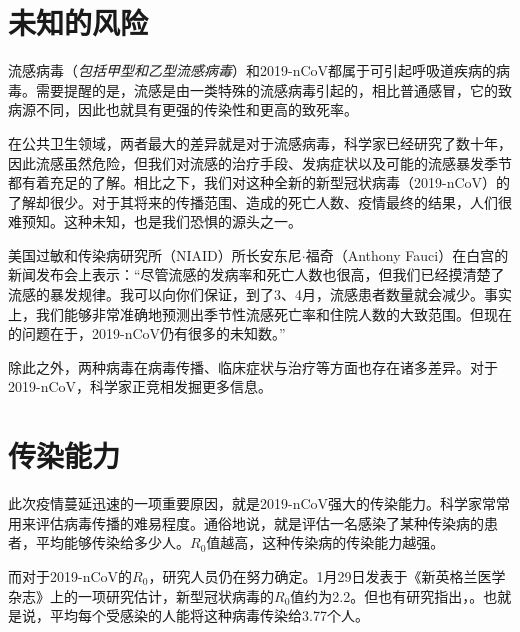 \begin{multicols}{3}

\section*{未知的风险}
流感病毒（\textit{包括甲型和乙型流感病毒}）和2019-nCoV都属于可引起呼吸道疾病的病毒。需要提醒的是，流感是由一类特殊的流感病毒引起的，相比普通感冒，它的致病源不同，因此也就具有更强的传染性和更高的致死率。

在公共卫生领域，两者最大的差异就是对于流感病毒，科学家已经研究了数十年，因此流感虽然危险，但我们对流感的治疗手段、发病症状以及可能的流感暴发季节都有着充足的了解。相比之下，我们对这种全新的新型冠状病毒（2019-nCoV）的了解却很少。对于其将来的传播范围、造成的死亡人数、疫情最终的结果，人们很难预知。这种未知，也是我们恐惧的源头之一。

美国过敏和传染病研究所（NIAID）所长安东尼$\cdot $福奇（Anthony 
Fauci）在白宫的新闻发布会上表示：``尽管流感的发病率和死亡人数也很高，但我们已经摸清楚了流感的暴发规律。我可以向你们保证，到了3、4月，流感患者数量就会减少。事实上，我们能够非常准确地预测出季节性流感死亡率和住院人数的大致范围。但现在的问题在于，2019-nCoV仍有很多的未知数。''

除此之外，两种病毒在病毒传播、临床症状与治疗等方面也存在诸多差异。对于2019-nCoV，科学家正竞相发掘更多信息。

\section*{传染能力}
此次疫情蔓延迅速的一项重要原因，就是2019-nCoV强大的传染能力。科学家常常用来评估病毒传播的难易程度。通俗地说，就是评估一名感染了某种传染病的患者，平均能够传染给多少人。$R_0$值越高，这种传染病的传染能力越强。

而对于2019-nCoV的$R_0$，研究人员仍在努力确定。1月29日发表于《新英格兰医学杂志》上的一项研究估计，新型冠状病毒的$R_0$值约为2.2。但也有研究指出，。也就是说，平均每个受感染的人能将这种病毒传染给3.77个人。


\end{multicols}
